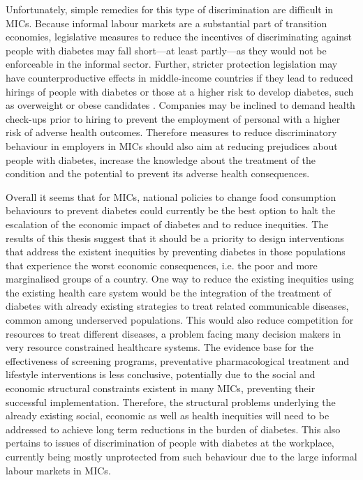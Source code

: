 Unfortunately, simple remedies for this type of discrimination are difficult in \acp{MIC}. Because informal labour markets are a substantial part of transition economies, legislative measures to reduce the incentives of discriminating against people with diabetes may fall short---at least partly---as they would not be enforceable in the informal sector. Further, stricter protection legislation may have counterproductive effects in middle-income countries if they lead to reduced hirings of people with diabetes or those at a higher risk to develop diabetes, such as overweight or obese candidates \parencite{Muravyev2014}. Companies may be inclined to demand health check-ups prior to hiring to prevent the employment of personal with a higher risk of adverse health outcomes. Therefore measures to reduce discriminatory behaviour in employers in \acp{MIC} should also aim at reducing prejudices about people with diabetes, increase the knowledge about the treatment of the condition and the potential to prevent its adverse health consequences.


Overall it seems that for \acp{MIC}, national policies to change food consumption behaviours to prevent diabetes could currently be the best option to halt the escalation of the economic impact of diabetes and to reduce inequities. The results of this thesis suggest that it should be a priority to design interventions that address the existent inequities by preventing diabetes in those populations that experience the worst economic consequences, i.e. the poor and more marginalised groups of a country. One way to reduce the existing inequities using the existing health care system would be the integration of the treatment of diabetes with already existing strategies to treat related communicable diseases, common among underserved populations. This would also reduce competition for resources to treat different diseases, a problem facing many decision makers in very resource constrained healthcare systems. The evidence base for the effectiveness of screening programs, preventative pharmacological treatment and lifestyle interventions is less conclusive, potentially due to the social and economic structural constraints existent in many \acp{MIC}, preventing their successful implementation. Therefore, the structural problems underlying the already existing social, economic as well as health inequities will need to be addressed to achieve long term reductions in the burden of diabetes. This also pertains to issues of discrimination of people with diabetes at the workplace, currently being mostly unprotected from such behaviour due to the large informal labour markets in \acp{MIC}.



